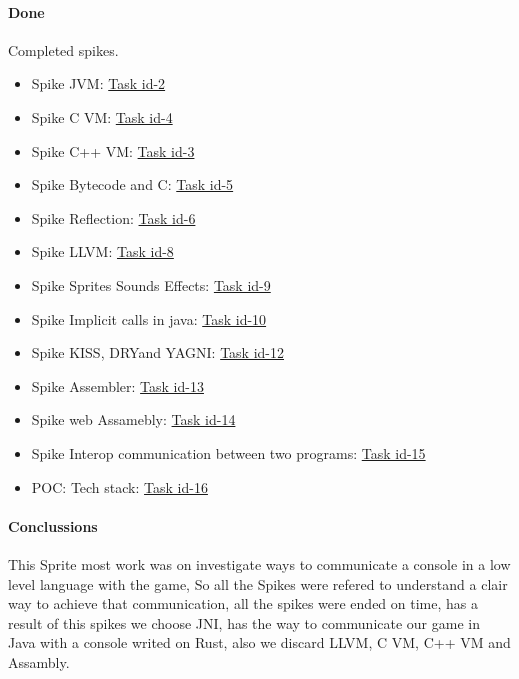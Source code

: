 \paragraph{Done}
Completed spikes.
\begin{itemize}
    \item Spike JVM: \href{https://tree.taiga.io/project/joseluis-teran-coffeetime/us/2?milestone=390348}{Task id-2}
    \item Spike C VM: \href{https://tree.taiga.io/project/joseluis-teran-coffeetime/us/4?milestone=390348}{Task id-4}
    \item Spike C++ VM: \href{https://tree.taiga.io/project/joseluis-teran-coffeetime/us/3?milestone=390348}{Task id-3}
    \item Spike Bytecode and C: \href{https://tree.taiga.io/project/joseluis-teran-coffeetime/us/5?milestone=390348}{Task id-5}
    \item Spike Reflection: \href{https://tree.taiga.io/project/joseluis-teran-coffeetime/us/6?milestone=390348}{Task id-6}
    \item Spike LLVM: \href{https://tree.taiga.io/project/joseluis-teran-coffeetime/us/8?milestone=390348}{Task id-8}
    \item Spike Sprites Sounds Effects: \href{https://tree.taiga.io/project/joseluis-teran-coffeetime/us/9?milestone=390348}{Task id-9}
    \item Spike Implicit calls in java: \href{https://tree.taiga.io/project/joseluis-teran-coffeetime/us/10?milestone=390348}{Task id-10}
    \item Spike KISS, DRYand YAGNI: \href{https://tree.taiga.io/project/joseluis-teran-coffeetime/us/12?milestone=390348}{Task id-12}
    \item Spike Assembler: \href{https://tree.taiga.io/project/joseluis-teran-coffeetime/us/13?milestone=390348}{Task id-13}
    \item Spike web Assamebly: \href{https://tree.taiga.io/project/joseluis-teran-coffeetime/us/14?milestone=390348}{Task id-14}
    \item Spike Interop communication between two programs: \href{https://tree.taiga.io/project/joseluis-teran-coffeetime/us/15?milestone=390348}{Task id-15}
    \item POC: Tech stack: \href{https://tree.taiga.io/project/joseluis-teran-coffeetime/us/16?milestone=390348}{Task id-16}
\end{itemize}

\paragraph{Conclussions}
This Sprite most work was on investigate ways to communicate a console in a low level language with the game, So all the Spikes were refered to understand a clair way to achieve that communication, all the spikes were ended on time, has a result of this spikes we choose JNI, has the way to communicate our game in Java with a console writed on Rust, also we discard LLVM, C VM, C++ VM and Assambly.

